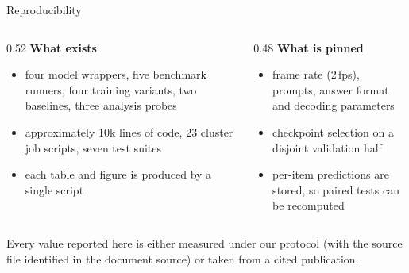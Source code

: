 \documentclass[aspectratio=169,11pt]{beamer}
\begin{document}
\begin{frame}{Reproducibility}
\begin{columns}[T]
\begin{column}{0.52\textwidth}
\textbf{What exists}
\begin{itemize}\footnotesize
\item four model wrappers, five benchmark runners, four training variants, two baselines, three
analysis probes
\item approximately 10k lines of code, 23 cluster job scripts, seven test suites
\item each table and figure is produced by a single script
\end{itemize}
\end{column}
\begin{column}{0.48\textwidth}
\textbf{What is pinned}
\begin{itemize}\footnotesize
\item frame rate (2\,fps), prompts, answer format and decoding parameters
\item checkpoint selection on a disjoint validation half
\item per-item predictions are stored, so paired tests can be recomputed
\end{itemize}
\end{column}
\end{columns}
\vfill
\begin{center}
\begin{block}{}
\centering\footnotesize Every value reported here is either measured under our protocol (with the source
file identified in the document source) or taken from a cited publication.
\end{block}
\end{center}
\end{frame}
\end{document}
